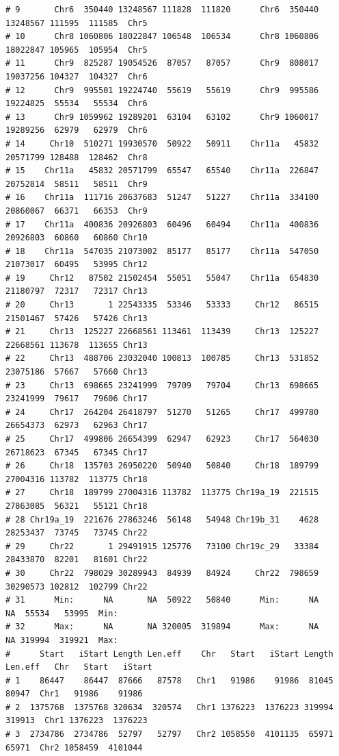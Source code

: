 \documentclass{article}\usepackage[]{graphicx}\usepackage[]{color}
\makeatletter
\newenvironment{kframe}{%
 \def\at@end@of@kframe{}%
 \ifinner\ifhmode%
  \def\at@end@of@kframe{\end{minipage}}%
  \begin{minipage}{\columnwidth}%
 \fi\fi%
 \def\FrameCommand##1{\hskip\@totalleftmargin \hskip-\fboxsep
 \colorbox{shadecolor}{##1}\hskip-\fboxsep
     \hskip-\linewidth \hskip-\@totalleftmargin \hskip\columnwidth}%
 \MakeFramed {\advance\hsize-\width
   \@totalleftmargin\z@ \linewidth\hsize
   \@setminipage}}%
 {\par\unskip\endMakeFramed%
 \at@end@of@kframe}
\newenvironment{knitrout}{}{} %
\makeatother
\begin{document}
\begin{knitrout}
\begin{kframe}
\begin{verbatim}
# 9       Chr6  350440 13248567 111828  111820      Chr6  350440 13248567 111595  111585  Chr5
# 10      Chr8 1060806 18022847 106548  106534      Chr8 1060806 18022847 105965  105954  Chr5
# 11      Chr9  825287 19054526  87057   87057      Chr9  808017 19037256 104327  104327  Chr6
# 12      Chr9  995501 19224740  55619   55619      Chr9  995586 19224825  55534   55534  Chr6
# 13      Chr9 1059962 19289201  63104   63102      Chr9 1060017 19289256  62979   62979  Chr6
# 14     Chr10  510271 19930570  50922   50911    Chr11a   45832 20571799 128488  128462  Chr8
# 15    Chr11a   45832 20571799  65547   65540    Chr11a  226847 20752814  58511   58511  Chr9
# 16    Chr11a  111716 20637683  51247   51227    Chr11a  334100 20860067  66371   66353  Chr9
# 17    Chr11a  400836 20926803  60496   60494    Chr11a  400836 20926803  60860   60860 Chr10
# 18    Chr11a  547035 21073002  85177   85177    Chr11a  547050 21073017  60495   53995 Chr12
# 19     Chr12   87502 21502454  55051   55047    Chr11a  654830 21180797  72317   72317 Chr13
# 20     Chr13       1 22543335  53346   53333     Chr12   86515 21501467  57426   57426 Chr13
# 21     Chr13  125227 22668561 113461  113439     Chr13  125227 22668561 113678  113655 Chr13
# 22     Chr13  488706 23032040 100813  100785     Chr13  531852 23075186  57667   57660 Chr13
# 23     Chr13  698665 23241999  79709   79704     Chr13  698665 23241999  79617   79606 Chr17
# 24     Chr17  264204 26418797  51270   51265     Chr17  499780 26654373  62973   62963 Chr17
# 25     Chr17  499806 26654399  62947   62923     Chr17  564030 26718623  67345   67345 Chr17
# 26     Chr18  135703 26950220  50940   50840     Chr18  189799 27004316 113782  113775 Chr18
# 27     Chr18  189799 27004316 113782  113775 Chr19a_19  221515 27863085  56321   55121 Chr18
# 28 Chr19a_19  221676 27863246  56148   54948 Chr19b_31    4628 28253437  73745   73745 Chr22
# 29     Chr22       1 29491915 125776   73100 Chr19c_29   33384 28433870  82201   81601 Chr22
# 30     Chr22  798029 30289943  84939   84924     Chr22  798659 30290573 102812  102799 Chr22
# 31      Min:      NA       NA  50922   50840      Min:      NA       NA  55534   53995  Min:
# 32      Max:      NA       NA 320005  319894      Max:      NA       NA 319994  319921  Max:
#      Start   iStart Length Len.eff    Chr   Start   iStart Length Len.eff   Chr   Start   iStart
# 1    86447    86447  87666   87578   Chr1   91986    91986  81045   80947  Chr1   91986    91986
# 2  1375768  1375768 320634  320574   Chr1 1376223  1376223 319994  319913  Chr1 1376223  1376223
# 3  2734786  2734786  52797   52797   Chr2 1058550  4101135  65971   65971  Chr2 1058459  4101044

\end{verbatim}
\end{kframe}
\end{knitrout}
\end{document}
